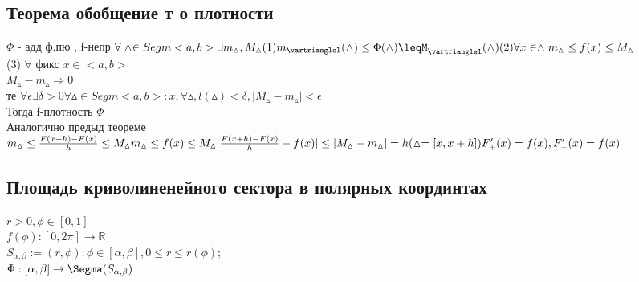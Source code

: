 \documentclass[12pt, a4paper]{article}
\newcommand{\nl}{\newline}
\begin{document}
{ \subsection{Теорема обобщение т о плотности} 
    $\Phi$ - адд ф.пю , f-непр
   	$ \forall \vartriangle \in Segm<a,b> \exists m_\vartriangle ,M_\vartriangle \\
    (1)
    m_\vartrianglel(\vartriangle) \leq \Phi(\vartriangle)\leqM_\vartrianglel(\vartriangle)\\
    (2) \forall x \in \vartriangle m_\vartriangle \leq f(x) \leq  M_\vartriangle$\\
    (3) $\forall$ фикс $x \in <a,b>$\\
    $M_\vartriangle-m_\vartriangle \Rightarrow 0$ \\
    те $\forall \epsilon  \exists \delta > 0  \forall \vartriangle \in Segm<a,b>: x,  \forall \vartriangle, l(\vartriangle) < \delta  ,          |M_\vartriangle - m_\vartriangle|<\epsilon$ \\
     Тогда f-плотность $\Phi$ \\
     \nl
 Аналогично предыд теореме \\
    $m_\vartriangle \leq \frac{F(x+h)-F(x)}{h} \leq M_\vartriangle \\
    m_\vartriangle \leq f(x)\leq M_\vartriangle
    |\frac{F(x+h)-F(x)}{h}-f(x)|\leq |M_\vartriangle-m_\vartriangle| = h (\vartriangle =[x,x+h]) \\
    F_+'(x)=f(x) , F_-'(x)=f(x)$ \\
    
\subsection{Площадь криволиненейного сектора в  полярных координтах}
$r > 0, \phi \in [0,1]$ \\
$f(\phi) : [0,2\pi] \rightarrow \mathbb{R}$\\
$S_{\alpha,\beta}:={(r,\phi) : \phi \in [\alpha,\beta], 0\leq r \leq r(\phi)}$;\\
 $\Phi :[\alpha,\beta]\rightarrow \Segma(S_{\alpha, \beta})$ \\
 
}
\end{document}
